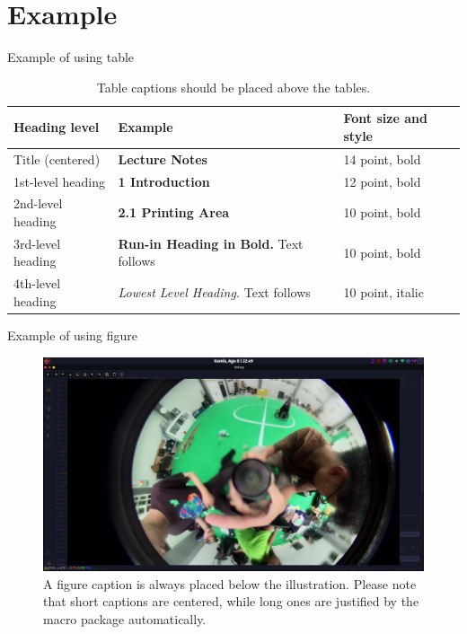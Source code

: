 
\section{Example}

Example of using table 
\begin{table}[H]
    \caption{Table captions should be placed above the
    tables.}\label{tab1}
    \begin{tabular}{|l|l|l|}
    \hline
    Heading level &  Example & Font size and style\\
    \hline
    Title (centered) &  {\Large\bfseries Lecture Notes} & 14 point, bold\\
    1st-level heading &  {\large\bfseries 1 Introduction} & 12 point, bold\\
    2nd-level heading & {\bfseries 2.1 Printing Area} & 10 point, bold\\
    3rd-level heading & {\bfseries Run-in Heading in Bold.} Text follows & 10 point, bold\\
    4th-level heading & {\itshape Lowest Level Heading.} Text follows & 10 point, italic\\
    \hline
    \end{tabular}
\end{table} 


Example of using figure 
\begin{figure}[H]
    \includegraphics[width=\textwidth]{images/leopard3.png}
    \caption{A figure caption is always placed below the illustration.
    Please note that short captions are centered, while long ones are
    justified by the macro package automatically.} \label{fig1}
\end{figure}

